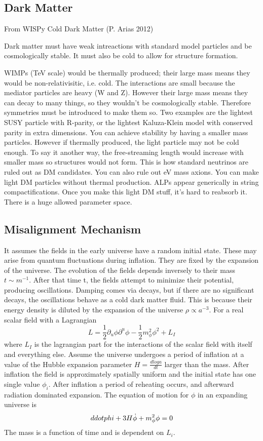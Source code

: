 \documentclass[12pt, twoside]{book}
\begin{document}
\subsection{Dark Matter}

From WISPy Cold Dark Matter (P. Arias 2012)

Dark matter must have weak intreactions with standard model particles and be cosmologically stable. It must also be cold to allow for structure formation.

WIMPs (TeV scale) would be thermally produced; their large mass means they would be non-relativisitic, i.e. cold. The interactions are small because the mediator particles are heavy (W and Z). However their large mass means they can decay to many things, so they wouldn't be cosmologically stable. Therefore symmetries must be introduced to make them so. Two examples are the lightest SUSY particle with R-parity, or the lightest Kaluza-Klein model with conserved parity in extra dimensions.
You can achieve stability by having a smaller mass particles. However if thermally produced, the light particle may not be cold enough. To say it another way, the free-streaming length would increase with smaller mass so structures would not form. This is how standard neutrinos are ruled out as DM candidates. You can also rule out eV mass axions.
You can make light DM particles without thermal production. ALPs appear generically in string compactifications. Once you make this light DM stuff, it's hard to reabsorb it. There is a huge allowed parameter space.
\subsection{Misalignment Mechanism}
It assumes the fields in the early universe have a random initial state. These may arise from quantum fluctuations during inflation. They are fixed by the expansion of the universe. The evolution of the fields depends inversely to their mass $t \sim m^{-1}$. After that time t, the fields attempt to minimize their potential, producing oscillations. Damping comes via decays, but if there are no significant decays, the oscillations behave as a cold dark matter fluid. This is because their energy density is diluted by the expansion of the universe $\rho \propto a^{-3}$.
For a real scalar field with a Lagrangian
$$L = \frac{1}{2}\partial_u \phi \partial^u \phi - \frac{1}{2}m_{\phi}^2\phi^2 + L_I$$
where $L_I$ is the lagrangian part for the interactions of the scalar field with itself and everything else. Assume the universe undergoes a period of inflation at a value of the Hubble expansion parameter $H = \frac{d log a}{dt}$ larger than the mass. After inflation the field is approximately spatially uniform and the initial state has one single value $\phi_i$. After inflation a period of reheating occurs, and afterward radiation dominated expansion. The equation of motion for $\phi$ in an expanding universe is 
$$\\ddot phi + 3 H \dot \phi + m_\phi^2 \phi = 0$$
The mass is a function of time and is dependent on $L_i$.
\end{document}

